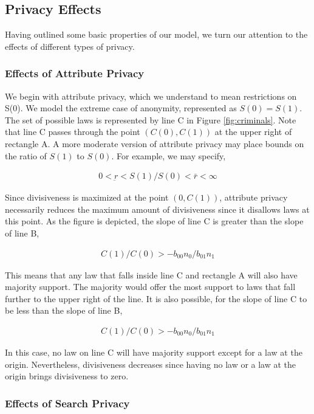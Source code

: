 \subsection{Privacy Effects}
Having outlined some basic properties of our model, we turn our attention to the effects of different types of privacy.  

\subsubsection{Effects of Attribute Privacy}
We begin with attribute privacy, which we understand to mean restrictions on S(0).  We model the extreme case of anonymity, represented as $S(0) = S(1)$.  The set of possible laws is represented by line C in Figure \ref{fig:criminals}.  Note that line C passes through the point $ \left(C(0), C(1) \right)$ at the upper right of rectangle A.  A more moderate version of attribute privacy may place bounds on the ratio of $S(1)$ to $S(0)$.  For example, we may specify,

\begin{align}
0 < \underbar r < S(1) /S(0) < \bar r < \infty
\end{align}

Since divisiveness is maximized at the point $ \left(0, C(1) \right)$, attribute privacy necessarily reduces the maximum amount of divisiveness since it disallows laws at this point.  As the figure is depicted, the slope of line C is greater than the slope of line B,

\begin{align}
C(1)/C(0) > - b_{00}n_0 / b_{01}n_1 
\end{align}

This means that any law that falls inside line C and rectangle A will also have majority support.  The majority would offer the most support to laws that fall further to the upper right of the line.  It is also possible, for the slope of line C to be less than the slope of line B,

\begin{align}
C(1)/C(0) > - b_{00}n_0 / b_{01}n_1 
\end{align}

In this case, no law on line C will have majority support except for a law at the origin.  Nevertheless, divisiveness decreases since having no law or a law at the origin brings divisiveness to zero.


\subsubsection{Effects of Search Privacy}

